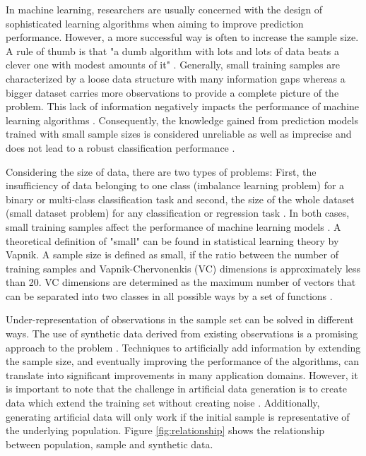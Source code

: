\documentclass[parskip=full]{scrartcl}
\begin{document}
In machine learning, researchers are usually concerned with the design of
sophisticated learning algorithms when aiming to improve prediction performance.
However, a more successful way is often to increase the sample size. A rule of
thumb is that "a dumb algorithm with lots and lots of data beats a clever one
with modest amounts of it" \cite{Domingos.2012}. Generally, small training
samples are characterized by a loose data structure with many information gaps
whereas a bigger dataset carries more observations to provide a complete picture
of the problem. This lack of information negatively impacts the performance of
machine learning algorithms \cite{Lin.2018}. Consequently, the knowledge gained
from prediction models trained with small sample sizes is considered unreliable
as well as imprecise and does not lead to a robust classification performance
\cite{AbdulLateh.2017}.

Considering the size of data, there are two types of problems: First, the
insufficiency of data belonging to one class (imbalance learning problem) for a
binary or multi-class classification task and second, the size of the whole
dataset (small dataset problem) for any classification or regression task
\cite{Sezer.2014}. In both cases, small training samples affect the performance
of machine learning models \cite{Tsai.2008}. A theoretical definition of "small"
can be found in statistical learning theory by Vapnik. A sample size is defined
as small, if the ratio between the number of training samples and
Vapnik-Chervonenkis (VC) dimensions is approximately less than 20. VC dimensions
are determined as the maximum number of vectors that can be separated into two
classes in all possible ways by a set of functions \cite{Vapnik.2008}.

Under-representation of observations in the sample set can be solved in
different ways. The use of synthetic data derived from existing observations is
a promising approach to the problem \cite{Sezer.2014}. Techniques to
artificially add information by extending the sample size, and eventually
improving the performance of the algorithms, can translate into significant
improvements in many application domains. However, it is important to note that
the challenge in artificial data generation is to create data which extend the
training set without creating noise \cite{Li.2006}. Additionally, generating
artificial data will only work if the initial sample is representative of the
underlying population. Figure \ref{fig:relationship} shows the relationship
between population, sample and synthetic data.
\end{document}
